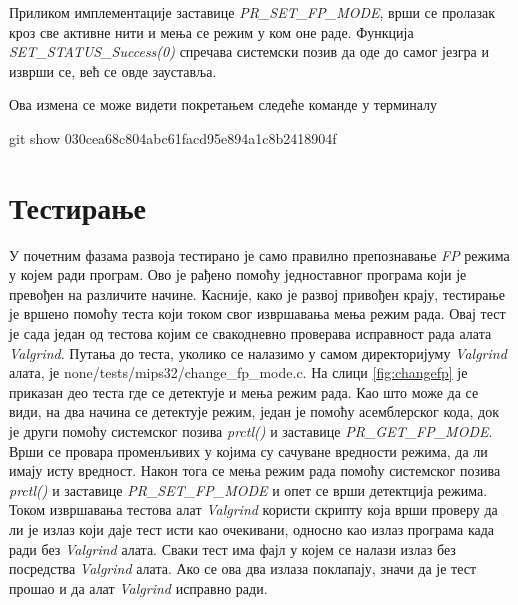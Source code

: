 \documentclass[12pt,oneside]{memoir}
\begin{document}
\indent Приликом имплементације заставице \textit{PR\_SET\_FP\-\_MODE}, врши се пролазак кроз све активне нити и мења се режим у ком оне раде. Функција \textit{SET\-\_STATUS\_Success(0)} спречава системски позив да оде до самог језгра и изврши се, већ се овде зауставља.

Ова измена се може видети покретањем следеће команде у терминалу

\begin{center}
git show 030cea68c804abc61facd95e894a1c8b2418904f
\end{center}

\section{Тестирање}

\indent У почетним фазама развоја тестирано је само правилно препознавање \textit{FP} режима у којем ради програм. Ово је рађено помоћу једноставног програма који је превођен на различите начине. Касније, како је развој привођен крају, тестирање је вршено помоћу теста који током свог извршавања мења режим рада. Овај тест је сада један од тестова којим се свакодневно проверава исправност рада алата \textit{Valgrind}. Путања до теста, уколико се налазимо у самом директоријуму \textit{Valgrind} алата, је none/tests/mips32/change\_fp\_mode.c. На слици \ref{fig:changefp} је приказан део теста где се детектује и мења режим рада. Као што може да се види, на два начина се детектује режим, један је помоћу асемблерског кода, док је други помоћу системског позива \textit{prctl()} и заставице \textit{PR\_GET\_FP\_MODE}. Врши се провара променљивих у којима су сачуване вредности режима, да ли имају исту вредност. Након тога се мења режим рада помоћу системског позива \textit{prctl()} и заставице \textit{PR\_SET\_FP\_MODE} и опет се врши детектција режима. Током извршавања тестова алат \textit{Valgrind} користи скрипту која врши проверу да ли је излаз који даје тест исти као очекивани, односно као излаз програма када ради без \textit{Valgrind} алата. Сваки тест има фајл у којем се налази излаз без посредства \textit{Valgrind} алата. Ако се ова два излаза поклапају, значи да је тест прошао и да алат \textit{Valgrind} исправно ради.
\end{document}
